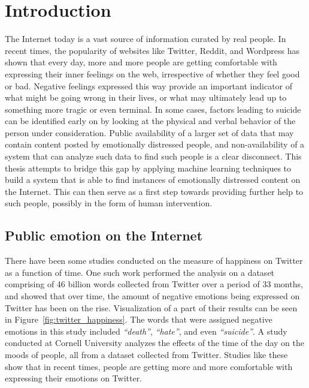 \chapter{Introduction}
\label{chapter:Introduction}

The Internet today is a vast source of information curated by real people. In recent times, the popularity of websites like Twitter, Reddit, and Wordpress has shown that every day, more and more people are getting comfortable with expressing their inner feelings on the web, irrespective of whether they feel good or bad. Negative feelings expressed this way provide an important indicator of what might be going wrong in their lives, or what may ultimately lead up to something more tragic or even terminal. In some cases, factors leading to suicide can be identified early on by looking at the physical and verbal behavior of the person under consideration. Public availability of a larger set of data that may contain content posted by emotionally distressed people, and non-availability of a system that can analyze such data to find such people is a clear disconnect. This thesis attempts to bridge this gap by applying machine learning techniques to build a system that is able to find instances of emotionally distressed content on the Internet. This can then serve as a first step towards providing further help to such people, possibly in the form of human intervention.

\section{Public emotion on the Internet}
There have been some studies conducted on the measure of happiness on Twitter as a function of time. One such work \cite{dodds2011temporal} performed the analysis on a dataset comprising of 46 billion words collected from Twitter over a period of 33 months, and showed that over time, the amount of negative emotions being expressed on Twitter has been on the rise. Visualization of a part of their results can be seen in Figure~\ref{fig:twitter_happiness}. The words that were assigned negative emotions in this study included \emph{``death''}, \emph{``hate''}, and even \emph{``suicide''}. A study conducted at Cornell University \cite{golder2011diurnal} analyzes the effects of the time of the day on the moods of people, all from a dataset collected from Twitter. Studies like these show that in recent times, people are getting more and more comfortable with expressing their emotions on Twitter.\\

